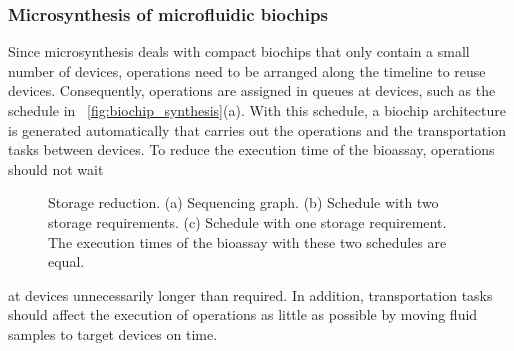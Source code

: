 \subsubsection{Microsynthesis of microfluidic biochips}



Since microsynthesis deals with compact 
biochips that only contain a small number of devices,
operations need to be arranged along the timeline to reuse devices.
Consequently, operations are assigned in queues at devices, such as the schedule in
\figname~\ref{fig:biochip_synthesis}(a). 
With this schedule,
a biochip architecture is generated automatically that
carries out the operations and the transportation tasks 
between devices.
To reduce the execution time of the bioassay, 
operations should
not wait 
\begin{wrapfigure}[33]{r}{0.4\textwidth}
{
\figurefontsize
\centering

\caption{Storage reduction. (a) Sequencing graph. 
(b) Schedule with two storage requirements. (c) Schedule
with one storage requirement. The execution 
times of the bioassay with these two schedules are equal.}
\label{fig:schedule_storage_p}
}
\end{wrapfigure}
at devices unnecessarily longer than required. In addition,
transportation tasks should affect the execution of operations as little as
possible by moving fluid samples to target devices on time. 


{}

